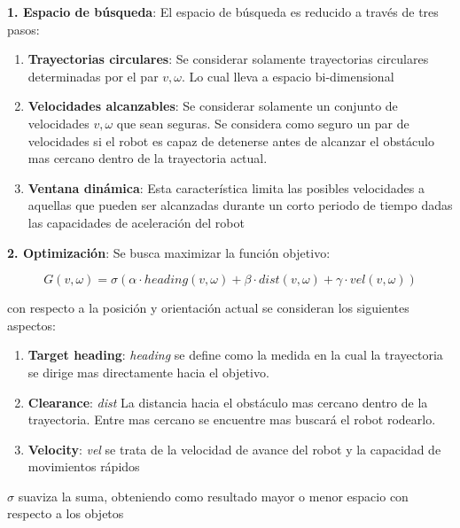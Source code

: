 \documentclass[12pt]{article}
\begin{document}
\begin{mdframed}
	\textbf{1. Espacio de búsqueda}: El espacio de búsqueda es reducido a través de tres pasos:
\begin{enumerate}[label={(\alph*)}]
	\item \textbf{Trayectorias circulares}: Se considerar solamente trayectorias circulares determinadas por el par $v, \omega$. Lo cual lleva a espacio bi-dimensional
	\item \textbf{Velocidades alcanzables}: Se considerar solamente un conjunto de velocidades $v, \omega$ que sean seguras. Se considera como seguro un par de velocidades si el robot es capaz de detenerse antes de alcanzar el obstáculo mas cercano dentro de la trayectoria actual.
	\item \textbf{Ventana dinámica}: Esta característica limita las posibles velocidades a aquellas que pueden ser alcanzadas durante un corto periodo de tiempo dadas las capacidades de aceleración del robot
\end{enumerate}


\textbf{2. Optimización}: Se busca maximizar la función objetivo:

	\begin{equation}
		G(v, \omega) = 
			\sigma(\alpha \cdot heading(v, \omega) + \beta \cdot dist(v, \omega) + \gamma \cdot vel(v, \omega))
	\end{equation}

con respecto a la posición y orientación actual se consideran los siguientes aspectos:

\begin{enumerate}[label={(\alph*)}]
	\item \textbf{Target heading}: \textit{heading} se define como la medida en la cual la trayectoria se dirige mas directamente hacia el objetivo.
	\item \textbf{Clearance}: \textit{dist} La distancia hacia el obstáculo mas cercano dentro de la trayectoria. Entre mas cercano se encuentre mas buscará el robot rodearlo.
	\item \textbf{Velocity}: \textit{vel} se trata de la velocidad de avance del robot y la capacidad de movimientos rápidos
\end{enumerate}
$\sigma$ suaviza la suma, obteniendo como resultado mayor o menor espacio con respecto a los objetos

\end{mdframed}
\end{document}
